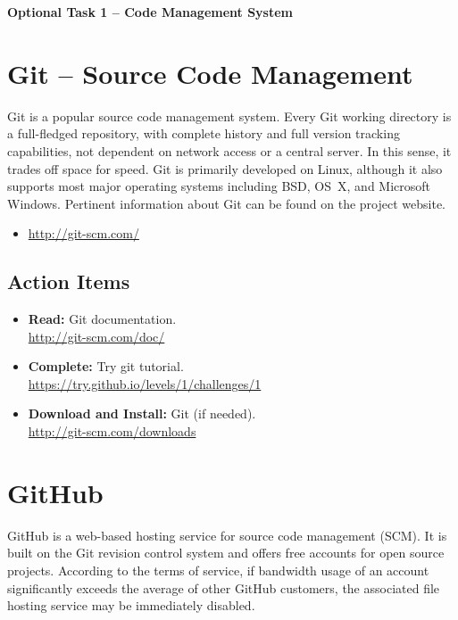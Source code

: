 \documentclass[11pt]{article}
\begin{document}
\begin{center}
{\bfseries \LARGE Optional Task 1 -- Code Management System\\[8mm]}
\end{center}


\section{Git -- Source Code Management}

Git is a popular source code management system.
Every Git working directory is a full-fledged repository, with complete history and full version tracking capabilities, not dependent on network access or a central server.
In this sense, it trades off space for speed.
Git is primarily developed on Linux, although it also supports most major operating systems including BSD, OS~X, and Microsoft Windows.
Pertinent information about Git can be found on the project website.
\begin{itemize}
\item \url{http://git-scm.com/}
\end{itemize}


\subsection*{Action Items}

\begin{itemize}
\item \textbf{Read:} Git documentation. \\
\url{http://git-scm.com/doc/}
\item \textbf{Complete:} Try git tutorial. \\
\url{https://try.github.io/levels/1/challenges/1}
\item \textbf{Download and Install:} Git (if needed). \\
\url{http://git-scm.com/downloads}
\end{itemize}


\section{GitHub}

GitHub is a web-based hosting service for source code management (SCM).
It is built on the Git revision control system and offers free accounts for open source projects.
According to the terms of service, if bandwidth usage of an account significantly exceeds the average of other GitHub customers, the associated file hosting service may be immediately disabled.
\end{document}

